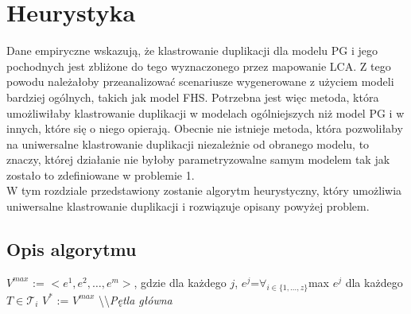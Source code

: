 \documentclass[licencjacka]{pracamgr}
\begin{document}
\chapter{Heurystyka}\label{r:heurystyka}
Dane empiryczne wskazują, że klastrowanie duplikacji dla modelu PG i jego pochodnych jest zbliżone do tego wyznaczonego przez mapowanie LCA. Z tego powodu należałoby przeanalizować scenariusze wygenerowane z użyciem modeli bardziej ogólnych, takich jak model FHS. Potrzebna jest więc metoda, która umożliwiłaby klastrowanie duplikacji w modelach ogólniejszych niż model PG i w innych, które się o niego opierają. 
Obecnie nie istnieje metoda, która pozwoliłaby na uniwersalne klastrowanie duplikacji niezależnie od obranego modelu, to znaczy, której działanie nie byłoby parametryzowalne samym modelem tak jak zostało to zdefiniowane w problemie 1. 
\\
W tym rozdziale przedstawiony zostanie algorytm heurystyczny, który umożliwia uniwersalne klastrowanie duplikacji i rozwiązuje opisany powyżej problem.

\section{Opis algorytmu}

\begin{algorithm}[H]
 $V^{max}$ := $<{e}^1,{e}^2, \dots , {e}^m>$, gdzie dla każdego $j$, ${e}^j$=$\forall_{i \in \{1,\dots,z\}}$max $e^j$ dla każdego $T \in \mathcal{T}_i$\;
 $V^*$ := $V^{max}$\;
 \textbackslash\textbackslash \textit{Pętla główna}\;
\end{algorithm}
\end{document}
